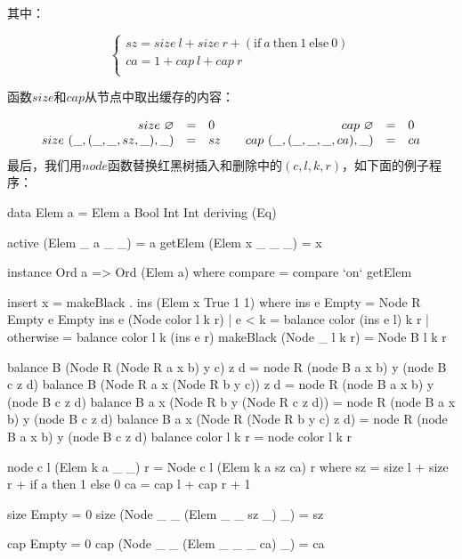 \documentclass[b5paper]{ctexart}
\begin{document}
\begin{Answer}[ref = {ex:mark-rebuild}]
{其中：

\[
\begin{cases}
sz = size\ l + size\ r + (\text{if}\ a\ \text{then}\ 1\ \text{else}\ 0) \\
ca = 1 + cap\ l + cap\ r \\
\end{cases}
\]

函数$size$和$cap$从节点中取出缓存的内容：

\[
\begin{array}{cc}
  \begin{array}{rcl}
  size\ \varnothing & = & 0 \\
  size\ (\_, (\_, \_, sz, \_), \_) & = & sz \\
  \end{array}
&
  \begin{array}{rcl}
  cap\ \varnothing & = & 0 \\
  cap\ (\_, (\_, \_, \_, ca), \_) & = & ca \\
  \end{array}
\end{array}
\]
最后，我们用$node$函数替换红黑树插入和删除中的$(c, l, k, r)$，如下面的例子程序：
\begin{Haskell}
data Elem a = Elem a Bool Int Int deriving (Eq)

active (Elem _ a _ _) = a
getElem (Elem x _ _ _) = x

instance Ord a => Ord (Elem a) where
  compare = compare `on` getElem

insert x = makeBlack . ins (Elem x True 1 1) where
    ins e Empty = Node R Empty e Empty
    ins e (Node color l k r)
        | e < k     = balance color (ins e l) k r
        | otherwise = balance color l k (ins e r)
    makeBlack (Node _ l k r) = Node B l k r

balance B (Node R (Node R a x b) y c) z d = node R (node B a x b) y (node B c z d)
balance B (Node R a x (Node R b y c)) z d = node R (node B a x b) y (node B c z d)
balance B a x (Node R b y (Node R c z d)) = node R (node B a x b) y (node B c z d)
balance B a x (Node R (Node R b y c) z d) = node R (node B a x b) y (node B c z d)
balance color l k r = node color l k r

node c l (Elem k a _ _) r = Node c l (Elem k a sz ca) r where
  sz = size l + size r + if a then 1 else 0
  ca = cap l + cap r + 1

size Empty = 0
size (Node _ _ (Elem _ _ sz _) _) = sz

cap Empty = 0
cap (Node _ _ (Elem _ _ _ ca) _) = ca


\end{Haskell}}
\end{Answer}
\end{document}
